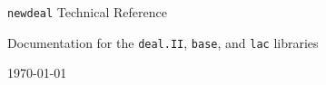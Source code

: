 \documentclass{book}
\begin{document}

\begin{center}
  {\LARGE \texttt{newdeal} Technical Reference}

  {\Large Documentation for the \texttt{deal.II}, \texttt{base}, and
  \texttt{lac} libraries}

  \today
\end{center}

\tableofcontents
\end{document}
